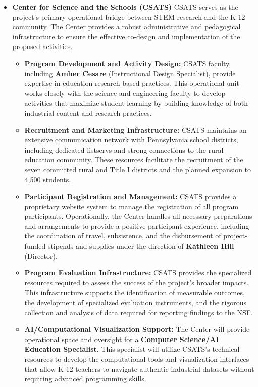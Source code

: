 \documentclass[11pt]{article}
\begin{document}
\begin{itemize}
\item \textbf{Center for Science and the Schools (CSATS)}
CSATS serves as the project’s primary operational bridge between STEM research and the K-12 community. The Center provides a robust administrative and pedagogical infrastructure to ensure the effective co-design and implementation of the proposed activities.

    \begin{itemize}[noitemsep]
        \item \textbf{Program Development and Activity Design:} CSATS faculty, including \textbf{Amber Cesare} (Instructional Design Specialist), provide expertise in education research-based practices. This operational unit works closely with the science and engineering faculty to develop activities that maximize student learning by building knowledge of both industrial content and research practices.
        
        \item \textbf{Recruitment and Marketing Infrastructure:} CSATS maintains an extensive communication network with Pennsylvania school districts, including dedicated listservs and strong connections to the rural education community. These resources facilitate the recruitment of the seven committed rural and Title I districts and the planned expansion to 4,500 students.
        
        \item \textbf{Participant Registration and Management:} CSATS provides a proprietary website system to manage the registration of all program participants. Operationally, the Center handles all necessary preparations and arrangements to provide a positive participant experience, including the coordination of travel, subsistence, and the disbursement of project-funded stipends and supplies under the direction of \textbf{Kathleen Hill} (Director).
        
        \item \textbf{Program Evaluation Infrastructure:} CSATS provides the specialized resources required to assess the success of the project’s broader impacts. This infrastructure supports the identification of measurable outcomes, the development of specialized evaluation instruments, and the rigorous collection and analysis of data required for reporting findings to the NSF.
        
        \item \textbf{AI/Computational Visualization Support:} The Center will provide operational space and oversight for a \textbf{Computer Science/AI Education Specialist}. This specialist will utilize CSATS’s technical resources to develop the computational tools and visualization interfaces that allow K-12 teachers to navigate authentic industrial datasets without requiring advanced programming skills.


\end{itemize}
\end{itemize}
\end{document}
